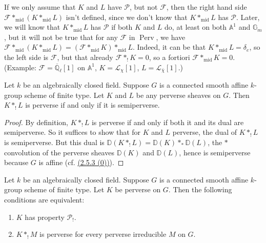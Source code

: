 If we only assume that \(K\) and \(L\) have \(\mathcal{P}\), but not
\(\mathcal{F}\), then the right hand side
\(\mathcal{F}*_{\mathrm{mid}}(K*_{\mathrm{mid}}L)\) isn't defined, since we
don't know that \(K*_{\mathrm{mid}}L\) has \(\mathcal{P}\). Later, we will know
that \(K*_{\mathrm{mid}}L\) has \(\mathcal{P}\) if both \(K\) and \(L\) do, at
least on both \(\mathbb{A}^1\) and \(\mathbb{G}_m\), but it will not be true
that for any \(\mathcal{F}\) in \(\operatorname{Perv}\), we have
\(\mathcal{F}*_{\mathrm{mid}}(K*_{\mathrm{mid}}L)=
(\mathcal{F}*_{\mathrm{mid}}K)*_{\mathrm{mid}}L\). Indeed, it can be that
\(K*_{\mathrm{mid}}L=\delta_e\), so the left side is \(\mathcal{F}\), but
that already \(\mathcal{F}*_!K=0\), so a fortiori
\(\mathcal{F}*_{\mathrm{mid}}K=0\). (Example:
\(\mathcal{F}=\overline{\mathbb{Q}}_\ell[1]\) on \(\mathbb{A}^1\),
\(K=\mathcal{L}_\chi[1]\), \(L=\mathcal{L}_{\bar{\chi}}[1]\).)

Let \(k\) be an algebraically closed field. Suppose \(G\) is a connected smooth
affine \(k\)-group scheme of finite type. Let \(K\) and \(L\) be any perverse
sheaves on \(G\). Then \(K*_!L\) is perverse if and only if it is
semiperverse.

\begin{proof}
By definition, \(K*_!L\) is perverse if and only if both it and its dual are
semiperverse. So it suffices to show that for \(K\) and \(L\) perverse, the
dual of \(K*_!L\) is semiperverse. But this dual is
\(\mathbb{D}(K*_!L)=\mathbb{D}(K)*_*\mathbb{D}(L)\), the \(*\) convolution of
the perverse sheaves \(\mathbb{D}(K)\) and \(\mathbb{D}(L)\), hence is
semiperverse because \(G\) is affine (cf. \hyperref[par:2.5.3]{(2.5.3 (0))}).
\end{proof}

Let \(k\) be an algebraically closed field. Suppose \(G\) is a connected smooth
affine \(k\)-group scheme of finite type. Let \(K\) be perverse on \(G\). Then
the following conditions are equivalent:
\begin{enumerate}[label=(\alph*)]
\item \(K\) has property \(\mathcal{P}_!\).
\item \(K*_!M\) is perverse for every perverse irreducible \(M\) on \(G\).
\end{enumerate}

